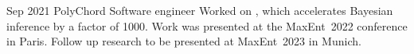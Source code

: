 \documentclass{CurriculumVitae}[10pt, condensed]
\begin{document}
%
    {Sep 2021}%
    {PolyChord}%
    {Software engineer}%
    {%
      Worked on , which accelerates Bayesian inference
      by a factor of 1000. Work was presented at the MaxEnt~2022
      conference in Paris. Follow up research to be presented at MaxEnt~2023 in Munich.
    }%

\end{document}
